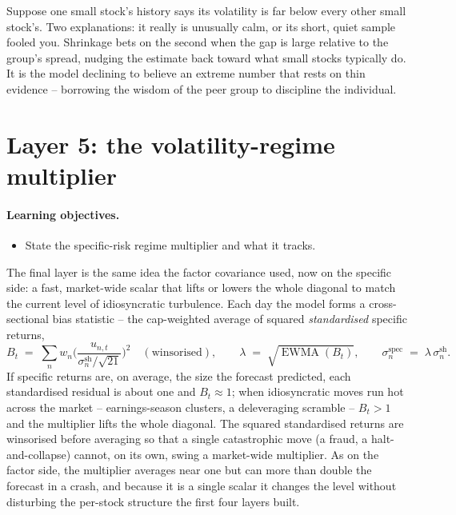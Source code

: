 \documentclass[11pt]{article}
\theoremstyle{definition}
\theoremstyle{plain}
\theoremstyle{remark}
\begin{document}
\begin{intuition}
Suppose one small stock's history says its volatility is far below every other small stock's. Two explanations: it really is unusually calm, or its short, quiet sample fooled you. Shrinkage bets on the second when the gap is large relative to the group's spread, nudging the estimate back toward what small stocks typically do. It is the model declining to believe an extreme number that rests on thin evidence -- borrowing the wisdom of the peer group to discipline the individual.
\end{intuition}

\section{Layer 5: the volatility-regime multiplier}\label{sec:vra}

\paragraph{Learning objectives.}
\begin{itemize}[leftmargin=1.4em,topsep=2pt]
  \item State the specific-risk regime multiplier and what it tracks.
\end{itemize}

The final layer is the same idea the factor covariance used, now on the specific side: a fast, market-wide scalar that lifts or lowers the whole diagonal to match the current level of idiosyncratic turbulence. Each day the model forms a cross-sectional bias statistic -- the cap-weighted average of squared \emph{standardised} specific returns,
\[
B_t \;=\; \sum_n w_n\Big(\frac{u_{n,t}}{\sigma^{\text{sh}}_n/\sqrt{21}}\Big)^{2}
\quad(\text{winsorised}),
\qquad
\lambda \;=\; \sqrt{\operatorname{EWMA}(B_t)},
\qquad
\sigma^{\text{spec}}_n \;=\; \lambda\,\sigma^{\text{sh}}_n .
\]
If specific returns are, on average, the size the forecast predicted, each standardised residual is about one and $B_t\approx 1$; when idiosyncratic moves run hot across the market -- earnings-season clusters, a deleveraging scramble -- $B_t>1$ and the multiplier lifts the whole diagonal. The squared standardised returns are winsorised before averaging so that a single catastrophic move (a fraud, a halt-and-collapse) cannot, on its own, swing a market-wide multiplier. As on the factor side, the multiplier averages near one but can more than double the forecast in a crash, and because it is a single scalar it changes the level without disturbing the per-stock structure the first four layers built.
\end{document}
